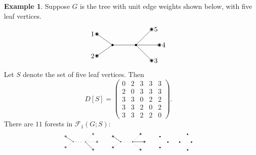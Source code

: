 \documentclass{amsart}
\theoremstyle{definition}
\newtheorem{eg}[thm]{Example}
\newcommand{\trees}{\mathcal{F}_1}
\begin{document}
\begin{eg}
Suppose $G$ is the tree with unit edge weights shown below, with five leaf vertices.
\[
\begin{tikzpicture}[scale=0.8]
	\coordinate (1) at (-2,0.7);
	\coordinate (2) at (-2,-0.7);
	\coordinate (3) at (1.5,-1);
	\coordinate (4) at (2,0);
	\coordinate (5) at (1.5,1);
	\coordinate (A) at (-1,0);
	\coordinate (B) at (0.5,0);
	
	\foreach \c in {1,2,3,4,5,A,B} {
		\fill (\c) circle (2pt);
	}
	\foreach \c in {1,2,3,4,5} {
		\draw (\c) circle (3pt);
	}

	\draw (A) -- (1);
	\draw (A) -- (2);
	\draw (B) -- (3);
	\draw (B) -- (4);
	\draw (B) -- (5);
	\draw (A) -- (B);
	
	\foreach \c/\d in {1/left,2/left,3/right,4/right,5/right} {
		\node[\d=0.2] at (\c) {$\c$};
	}
\end{tikzpicture}
\]
Let $S$ denote the set of five leaf vertices. Then
$$
D[S] = \begin{pmatrix}
0 & 2 & 3 & 3 & 3 \\
2 & 0 & 3 & 3 & 3 \\
3 & 3 & 0 & 2 & 2 \\
3 & 3 & 2 & 0 & 2 \\
3 & 3 & 2 & 2 & 0
\end{pmatrix}.
$$
There are $11$ forests in $\trees(G;S)$:
\[
\begin{tikzpicture}[scale=0.4]
	\coordinate (1) at (-2,0.7);
	\coordinate (2) at (-2,-0.7);
	\coordinate (3) at (1.5,-1);
	\coordinate (4) at (2,0);
	\coordinate (5) at (1.5,1);
	\coordinate (A) at (-1,0);
	\coordinate (B) at (0.5,0);
	
	\foreach \c in {1,2,3,4,5,A,B} {
		\fill (\c) circle (1.5pt);
	}
	\foreach \c in {1,2,3,4,5} {
		\draw (\c) circle (3pt);
	}

	\draw (A) -- (1);
	\draw[dotted] (A) -- (2);
	\draw (B) -- (3);
	\draw[dotted] (B) -- (4);
	\draw[dotted] (B) -- (5);
	\draw[dotted] (A) -- (B);
\end{tikzpicture}
\qquad
\begin{tikzpicture}[scale=0.4]
	\coordinate (1) at (-2,0.7);
	\coordinate (2) at (-2,-0.7);
	\coordinate (3) at (1.5,-1);
	\coordinate (4) at (2,0);
	\coordinate (5) at (1.5,1);
	\coordinate (A) at (-1,0);
	\coordinate (B) at (0.5,0);
	
	\foreach \c in {1,2,3,4,5,A,B} {
		\fill (\c) circle (1.8pt);
	}
	\foreach \c in {1,2,3,4,5} {
		\draw (\c) circle (3pt);
	}

	\draw (A) -- (1);
	\draw[dotted] (A) -- (2);
	\draw[dotted] (B) -- (3);
	\draw (B) -- (4);
	\draw[dotted] (B) -- (5);
	\draw[dotted] (A) -- (B);
\end{tikzpicture}
\qquad
\begin{tikzpicture}[scale=0.4]
	\filldraw[black] (-2,0.7) coordinate (1) circle (2pt);
	\filldraw[black] (-2,-0.7) coordinate (2) circle (2pt);
	\filldraw[black] (1.5,-1) coordinate (3) circle (2pt);
	\filldraw[black] (2,0) coordinate (4) circle (2pt);
	\filldraw[black] (1.5,1) coordinate (5) circle (2pt);
	\filldraw[black] (-1,0) coordinate (A) circle (2pt);
	\filldraw[black] (0.5,0) coordinate (B) circle (2pt);


\end{tikzpicture}\]
\end{eg}
\end{document}

